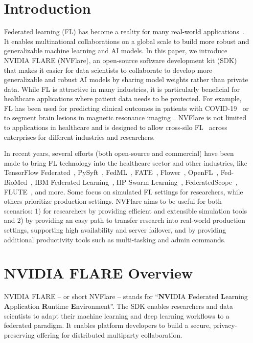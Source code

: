 \documentclass[11pt]{article}
\begin{document}
\section{Introduction}
Federated learning (FL) has become a reality for many real-world applications~\cite{rieke2020future}. It enables multinational collaborations on a global scale to build more robust and generalizable machine learning and AI models. 
%
In this paper, we introduce NVIDIA FLARE (NVFlare), an open-source software development kit (SDK) that makes it easier for data scientists to collaborate to develop more generalizable and robust AI models by sharing model weights rather than private data.
%
While FL is attractive in many industries, it is particularly beneficial for healthcare applications where patient data needs to be protected. For example, FL has been used for predicting clinical outcomes in patients with COVID-19~\cite{dayan2021federated} or to segment brain lesions in magnetic resonance imaging~\cite{sheller2018multi,sheller2020federated}. NVFlare is not limited to applications in healthcare and is designed to allow cross-silo FL~\cite{kairouz2019advances} across enterprises for different industries and researchers. 

In recent years, several efforts (both open-source and commercial) have been made to bring FL technology into the healthcare sector and other industries, like TensorFlow Federated~\cite{abadi2016tensorflow}, PySyft~\cite{ziller2021pysyft}, FedML~\cite{he2020fedml}, FATE~\cite{liu2021fate}, Flower~\cite{beutel2020flower}, OpenFL~\cite{reina2021openfl}, Fed-BioMed~\cite{silva2020fed}, IBM Federated Learning~\cite{ludwig2020ibm}, HP Swarm Learning~\cite{warnat2021swarm}, FederatedScope~\cite{xie2022federatedscope}, FLUTE~\cite{dimitriadis2022flute}, and more. Some focus on simulated FL settings for researchers, while others prioritize production settings. NVFlare aims to be useful for both scenarios: 1) for researchers by providing efficient and extensible simulation tools and 2) by providing an easy path to transfer research into real-world production settings, supporting high availability and server failover, and by providing additional productivity tools such as multi-tasking and admin commands.

\section{NVIDIA FLARE Overview}

NVIDIA FLARE -- or short NVFlare -- stands for ``\textbf{NV}IDIA \textbf{F}ederated \textbf{L}earning \textbf{A}pplication \textbf{R}untime \textbf{E}nvironment''. 
The SDK enables researchers and data scientists to adapt their machine learning and deep learning workflows to a federated paradigm. It enables platform developers to build a secure, privacy-preserving offering for distributed multiparty collaboration.
\end{document}
